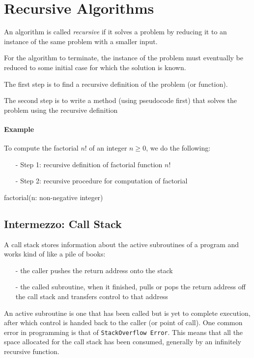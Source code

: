 \documentclass[10pt,a4paper]{book}
\begin{document}
\section{Recursive Algorithms}
An algorithm is called \textit{recursive} if it solves a problem by reducing it to an instance of the same problem with a smaller input.\par
For the algorithm to terminate, the instance of the problem must eventually be reduced to some initial case for which the solution is known.\par 
The first step is to find a recursive definition of the problem (or function).\par 
The second step is to write a method (using pseudocode first) that solves the problem using the recursive definition
\paragraph*{Example}
To compute the factorial $n!$ of an integer $n \geqslant 0$, we do the following:
\begin{enumerate}
\item[-] Step 1: recursive definition of factorial function $n!$
\item[-] Step 2: recursive procedure for computation of factorial
\end{enumerate}
\begin{procedure}
\caption{factorial(n: non-negative integer)}
\DontPrintSemicolon
\SetAlgoNoEnd

\end{procedure}
\subsection{Intermezzo: Call Stack}
A call stack stores information about the active subroutines of a program and works kind of like a pile of books: 
\begin{itemize}
\item[-] the caller pushes the return address onto the stack
\item[-] the called subroutine, when it finished, pulls or pops the return address off the call stack and transfers control to that address
\end{itemize}
An active subroutine is one that has been called but is yet to complete execution, after which control is handed back to the caller (or point of call). One common error in programming is that of \texttt{StackOverflow Error}. This means that all the space allocated for the call stack has been consumed, generally by an infinitely recursive function.\par 
\end{document}
